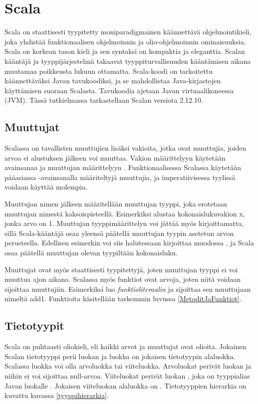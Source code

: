 \chapter{Scala} \label{Scala}
Scala on staattisesti tyypitetty moniparadigmainen käännettävä ohjelmointikieli, joka yhdistää funktionaalisen ohjelmoinnin ja olio-ohjelmoinnin ominaisuuksia. Scala on korkean tason kieli ja sen syntaksi on kompaktia ja eleganttia. Scalan kääntäjä ja tyyppijärjestelmä takaavat tyyppiturvallisuuden kääntämisen aikana muutamaa poikkeusta lukuun ottamatta. Scala-koodi on tarkoitettu käännettäväksi Javan tavukoodiksi, ja se mahdollistaa Java-kirjastojen käyttämisen suoraan Scalasta. Tavukoodia ajetaan Javan virtuaalikoneessa (JVM). Tässä tutkielmassa tarkastellaan Scalan versiota 2.12.10.
\cite[Introduction]{tourOfScala}
\cite[Luku 2]{prorgrammingInScala3rd}


\section{Muuttujat} \label{Muuttujat}
Scalassa on tavallisten muuttujien lisäksi vakioita, jotka ovat muuttujia, joiden arvoa ei alustuksen jälkeen voi muuttaa. Vakion määrittelyyn käytetään avainsanaa  ja muuttujan määrittelyyn . Funktionaalisessa Scalassa käytetään pääasiassa -avainsanalla määriteltyjä muuttujia, ja imperatiivisessa tyylissä voidaan käyttää molempia.

Muuttujan nimen jälkeen määritellään muuttujan tyyppi, joka erotetaan muuttujan nimestä kaksoispisteellä. Esimerkiksi  alustaa kokonaislukuvakion x, jonka arvo on 1. Muuttujan tyyppimäärittelyn voi jättää myös kirjoittamatta, sillä Scala-kääntäjä osaa yleensä päätellä muuttujan tyypin asetetun arvon perusteella. Edellisen esimerkin voi siis halutessaan kirjoittaa muodossa , ja Scala osaa päätellä muuttujan olevan tyypiltään kokonaisluku.
\cite[Basics]{tourOfScala}

Muuttujat ovat myös staattisesti tyypitettyjä, joten muuttujan tyyppi ei voi muuttua ajon aikana. Scalassa myös funktiot ovat arvoja, joten niitä voidaan sijoittaa muuttujiin. Esimerkiksi  luo \textit{funktioliteraalin} ja sijoittaa sen muuttujaan nimeltä add1. Funktioita käsitellään tarkemmin luvussa \ref{MetoditJaFunktiot}.
\cite[Luku 1]{prorgrammingInScala3rd}


\section{Tietotyypit}
Scala on puhtaasti oliokieli, eli kaikki arvot ja muuttujat ovat olioita. Jokainen Scalan tietotyyppi perii luokan  ja luokka  on jokaisen tietotyypin alaluokka. Scalassa luokka voi olla arvoluokka tai viiteluokka. Arvoluokat perivät luokan  ja niihin ei voi sijoittaa null-arvoa. Viiteluokat perivät luokan , joka on tyyppialias Javan luokalle . Jokaisen viiteluokan alaluokka on . Tietotyyppien hierarkia on kuvattu kuvassa \ref{tyyppihierarkia}.
\cite[Luku 5]{prorgrammingInScala3rd}

